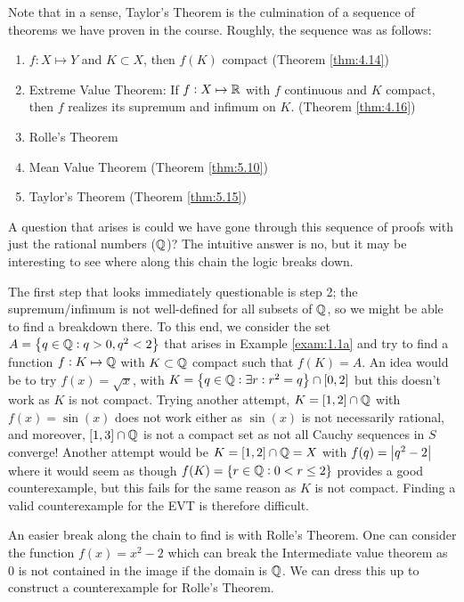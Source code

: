 Note that in a sense, Taylor's Theorem is the culmination of a sequence of theorems we have proven in the course. Roughly, the sequence was as follows:
\begin{enumerate}[1)]
    \item $f: X \mapsto Y$ and $K \subset X$, then $f(K)$ compact (Theorem \ref{thm:4.14})
    \item Extreme Value Theorem: If $f: X \mapsto \mathbb{R}$ with $f$ continuous and $K$ compact, then $f$ realizes its supremum and infimum on $K$. (Theorem \ref{thm:4.16})
    \item Rolle's Theorem
    \item Mean Value Theorem (Theorem \ref{thm:5.10})
    \item Taylor's Theorem (Theorem \ref{thm:5.15})
\end{enumerate}
A question that arises is could we have gone through this sequence of proofs with just the rational numbers ($\mathbb{Q}$)? The intuitive answer is no, but it may be interesting to see where along this chain the logic breaks down.

The first step that looks immediately questionable is step 2; the supremum/infimum is not well-defined for all subsets of $\mathbb{Q}$, so we might be able to find a breakdown there. To this end, we consider the set $A = \set{q \in \mathbb{Q}: q > 0, q^2 < 2}$ that arises in Example \ref{exam:1.1a} and try to find a function $f: K \mapsto \mathbb{Q}$ with $K \subset \mathbb{Q}$ compact such that $f(K) = A$. An idea would be to try $f(x) = \sqrt{x}$, with $K = \set{q \in \mathbb{Q}: \exists r: r^2 = q} \cap [0, 2]$ but this doesn't work as $K$ is not compact. Trying another attempt, $K = [1, 2] \cap \mathbb{Q}$ with $f(x) = \sin(x)$ does not work either as $\sin(x)$ is not necessarily rational, and moreover, $[1, 3] \cap \mathbb{Q}$ is not a compact set as not all Cauchy sequences in $S$ converge! Another attempt would be $K = [1, 2] \cap \mathbb{Q} = X$ with $f(q) = \abs{q^2 - 2}$ where it would seem as though $f(K) = \set{r \in \mathbb{Q}: 0 < r \leq 2}$ provides a good counterexample, but this fails for the same reason as $K$ is not compact. Finding a valid counterexample for the EVT is therefore difficult. 

An easier break along the chain to find is with Rolle's Theorem. One can consider the function $f(x) = x^2 - 2$ which can break the Intermediate value theorem as $0$ is not contained in the image if the domain is $\mathbb{Q}$. We can dress this up to construct a counterexample for Rolle's Theorem.

